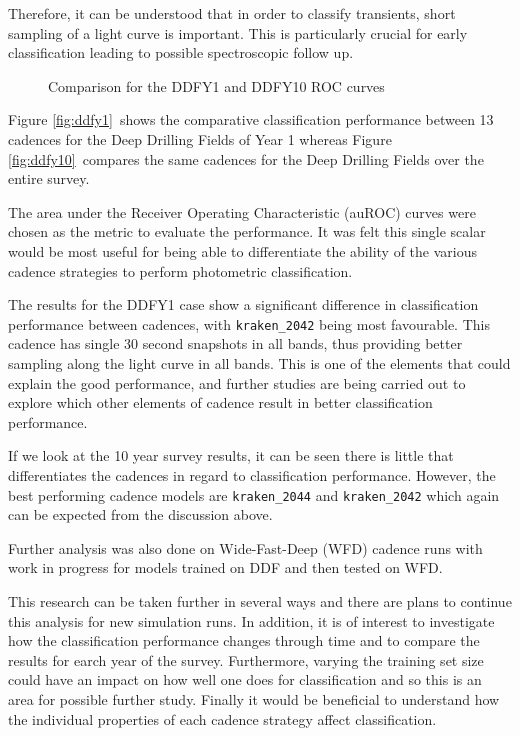 Therefore, it can be understood that in order to classify transients, short
sampling of a light curve is important. This is particularly crucial for early classification
leading to possible spectroscopic follow up.


\begin{figure}
  \centering
  \caption{Comparison for the DDFY1 and DDFY10 ROC curves}\label{fig:rocs}
\end{figure}

Figure \ref{fig:ddfy1}~shows the comparative classification performance between 13 cadences for the Deep
Drilling Fields of Year 1 whereas Figure \ref{fig:ddfy10}~compares the same
cadences for the Deep Drilling Fields over the entire survey.

The area under the Receiver Operating Characteristic (auROC) curves were chosen as the metric
to evaluate the performance. It was felt this single scalar would be most useful
for being able to differentiate the ability of the various cadence strategies
to perform photometric classification.


The results for the DDFY1 case show a significant difference in classification
performance between cadences, with {\tt kraken\_2042} being most favourable.
This cadence has single 30 second snapshots in all bands, thus providing better
sampling along the light curve in all bands. This is one of the elements that could explain
the good performance, and further studies are being carried out to explore which
other elements of cadence result in better classification performance.

If we look at the 10 year survey results, it can be seen there is
little that differentiates the cadences in regard to classification performance.
However, the best performing cadence models are {\tt kraken_2044} and
{\tt kraken_2042} which again can be expected from the discussion above.

Further analysis was also done on Wide-Fast-Deep (WFD) cadence runs with work in
progress for models trained on DDF and then tested on WFD.

This research can be taken further in several ways and there are plans to
continue this analysis for new \opsim simulation runs.  In addition, it is
of interest to investigate how the classification performance changes through
time and to compare the results for earch year of the survey. Furthermore,
varying the training set size could have an impact on how well one does for
classification and so this is an area for possible further study.
Finally it would be beneficial to understand how the individual properties of each cadence
strategy affect classification.
